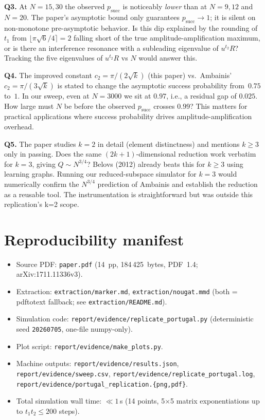 \documentclass[11pt]{article}
\begin{document}
\textbf{Q3.} At $N=15, 30$ the observed $p_{\text{succ}}$ is
noticeably \emph{lower} than at $N=9, 12$ and $N=20$. The paper's
asymptotic bound only guarantees $p_{\text{succ}} \to 1$; it is silent
on non-monotone pre-asymptotic behavior. Is this dip explained by the
rounding of $t_1$ from $\lfloor \pi\sqrt{6}/4 \rceil = 2$ falling short
of the true amplitude-amplification maximum, or is there an interference
resonance with a subleading eigenvalue of $u^{t_2} R$? Tracking the
five eigenvalues of $u^{t_2} R$ vs $N$ would answer this.

\textbf{Q4.} The improved constant $c_2 = \pi/(2\sqrt{k})$ (this paper)
vs.\ Ambainis' $c_2 = \pi/(3\sqrt{k})$ is stated to change the
asymptotic success probability from~$0.75$ to~$1$. In our sweep,
even at $N=3000$ we sit at $0.97$, i.e., a residual gap of $0.025$.
How large must $N$ be before the observed $p_{\text{succ}}$ crosses
$0.99$? This matters for practical applications where success
probability drives amplitude-amplification overhead.

\textbf{Q5.} The paper studies $k=2$ in detail (element distinctness)
and mentions $k \ge 3$ only in passing. Does the same
$(2k+1)$-dimensional reduction work verbatim for $k=3$, giving
$Q \sim N^{3/4}$? Belovs (2012) already beats this for $k \ge 3$ using
learning graphs. Running our reduced-subspace simulator for $k=3$
would numerically confirm the $N^{3/4}$ prediction of Ambainis and
establish the reduction as a reusable tool. The instrumentation is
straightforward but was outside this replication's k=2 scope.

\section{Reproducibility manifest}

\begin{itemize}[nosep]
  \item Source PDF: \texttt{paper.pdf} (14~pp, 184\,425~bytes, PDF~1.4;
        arXiv:1711.11336v3).
  \item Extraction: \texttt{extraction/marker.md}, \texttt{extraction/nougat.mmd}
        (both = pdftotext fallback; see \texttt{extraction/README.md}).
  \item Simulation code: \texttt{report/evidence/replicate\_portugal.py}
        (deterministic seed \texttt{20260705}, one-file numpy-only).
  \item Plot script: \texttt{report/evidence/make\_plots.py}.
  \item Machine outputs: \texttt{report/evidence/results.json},
        \texttt{report/evidence/sweep.csv},
        \texttt{report/evidence/replicate\_portugal.log},
        \texttt{report/evidence/portugal\_replication.\{png,pdf\}}.
  \item Total simulation wall time: $\ll 1$\,s (14 points, 5$\times$5
        matrix exponentiations up to $t_1 t_2 \le 200$ steps).
\end{itemize}
\end{document}
